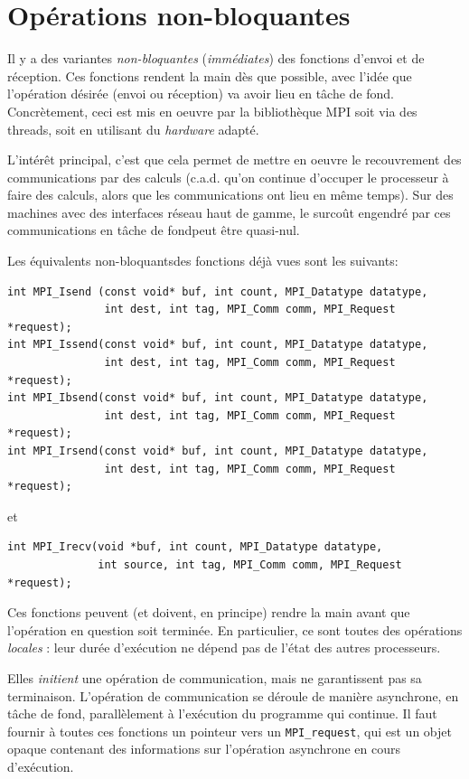 \section{Opérations non-bloquantes}

Il y a des variantes \emph{non-bloquantes} (\emph{immédiates}) des fonctions
d'envoi et de réception. Ces fonctions rendent la main dès que possible, avec
l'idée que l'opération désirée (envoi ou réception) va avoir lieu en tâche de
fond. Concrètement, ceci est mis en oeuvre par la bibliothèque MPI soit via des
threads, soit en utilisant du \emph{hardware} adapté.

L'intérêt principal, c'est que cela permet de mettre en oeuvre le recouvrement
des communications par des calculs (c.a.d. qu'on continue d'occuper le
processeur à faire des calculs, alors que les communications ont lieu en même
temps). Sur des machines avec des interfaces réseau haut de gamme, le surcoût
engendré par ces communications \og en tâche de fond\fg peut être quasi-nul.

Les équivalents \og non-bloquants\fg des fonctions déjà vues sont les suivants:
\begin{verbatim}
int MPI_Isend (const void* buf, int count, MPI_Datatype datatype, 
               int dest, int tag, MPI_Comm comm, MPI_Request *request);
int MPI_Issend(const void* buf, int count, MPI_Datatype datatype, 
               int dest, int tag, MPI_Comm comm, MPI_Request *request);
int MPI_Ibsend(const void* buf, int count, MPI_Datatype datatype, 
               int dest, int tag, MPI_Comm comm, MPI_Request *request);
int MPI_Irsend(const void* buf, int count, MPI_Datatype datatype, 
               int dest, int tag, MPI_Comm comm, MPI_Request *request);
\end{verbatim}
et
\begin{verbatim}
int MPI_Irecv(void *buf, int count, MPI_Datatype datatype,
              int source, int tag, MPI_Comm comm, MPI_Request *request);
\end{verbatim}

Ces fonctions peuvent (et doivent, en principe) rendre la main avant que
l'opération en question soit terminée. En particulier, ce sont toutes des
opérations \emph{locales} : leur durée d'exécution ne dépend pas de l'état des
autres processeurs.

Elles \emph{initient} une opération de communication, mais ne garantissent pas
sa terminaison. L'opération de communication se déroule de manière asynchrone,
\og en tâche de fond\fg, parallèlement à l'exécution du programme qui
continue. Il faut fournir à toutes ces fonctions un pointeur vers un
\verb|MPI_request|, qui est un objet opaque contenant des informations sur
l'opération asynchrone en cours d'exécution.

